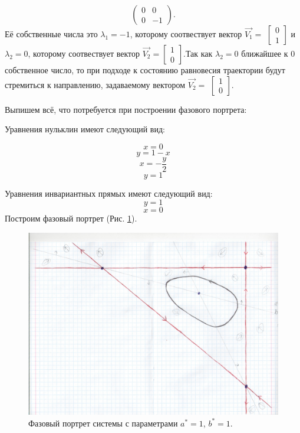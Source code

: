 \begin{itemize}
{		$$\begin{pmatrix}0 & 0\\0 & -1\end{pmatrix}. $$Её собственные числа это $\lambda_1=-1$, которому соотвествует вектор $\Vec{V_1}=$ $\left[\begin{matrix}0\\1\end{matrix}\right]$ и $\lambda_2=0$, которому соотвествует вектор $\Vec{V_2}=$$\left[\begin{matrix}1\\0\end{matrix}\right]$.Так как $\lambda_2=0$ ближайшее к $0$ собственное число, то при подходе к состоянию равновесия траектории будут стремиться к направлению, задаваемому вектором $\Vec{V_2}=$ $\left[\begin{matrix}1\\0\end{matrix}\right]$.}
\end{itemize} 

Выпишем всё, что потребуется при построении фазового портрета:

Уравнения нульклин имеют следующий вид: 

$$x=0$$
$$y=1 - x$$
$$x=- \frac{y}{2}$$
$$y=1$$


Уравнения инвариантных прямых имеют следующий вид: 
$$y = 1$$
$$x = 0$$
Построим фазовый портрет (Рис. \ref{fig:phportr19}).

\begin{figure}[h]
	
	\includegraphics[width=\textwidth]{phptr/(12, 4).jpg}
	\centering
	\caption{\label{fig:phportr19} Фазовый портрет системы с параметрами $a^\ast = 1$, $b^\ast = 1$.}
	
\end{figure}

